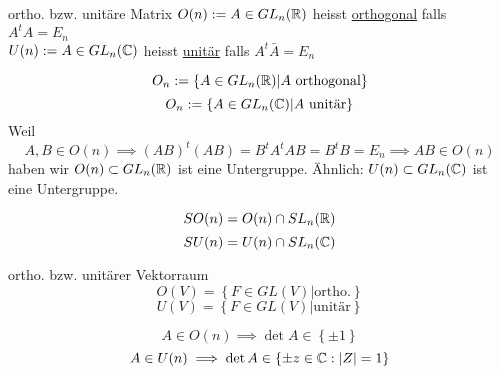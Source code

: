 \begin{Def}{ortho. bzw. unitäre Matrix}
  $O(n):= A\in GL_n(\mathbb{R})$ heisst \underline{orthogonal} falls $A^tA=E_n$\\
  $U(n):= A\in GL_n(\mathbb{C})$ heisst \underline{unitär} falls $A^t\bar{A}=E_n$
\end{Def}
\begin{Not}
  \[O_n:=\left\{ A\in GL_n(\mb{R})|A\ \text{orthogonal} \right\}\]
  \[O_n:=\left\{ A\in GL_n(\mathbb{C})|A\ \text{unitär} \right\}\]
  Weil
  \[A,B\in O(n)\implies (AB)^t(AB)=B^tA^tAB=B^tB=E_n\implies AB\in O(n)\]
  haben wir $O(n)\subset GL_n(\mathbb{R})$ ist eine Untergruppe. Ähnlich: $U(n)\subset GL_n(\mathbb{C})$ ist eine Untergruppe.
\end{Not}
\begin{Not}
  \[SO(n)=O(n)\cap SL_n(\mathbb{R})\]
  \[SU(n)=U(n)\cap SL_n(\mathbb{C})\]
\end{Not}
\begin{Not}{ortho. bzw. unitärer Vektorraum}
  \[O(V)=\left\{ F\in GL(V)|\text{ortho.} \right\}\]
  \[U(V)=\left\{ F\in GL(V)|\text{unitär} \right\}\]
\end{Not}
\begin{Bem}
  \[A\in O(n)\implies \det A\in \left\{ \pm 1 \right\}\]
  \[A\in U(n)\implies \det A\in \left\{ \pm z\in\mathbb{C}: \left| Z \right|=1 \right\}\]
\end{Bem}
